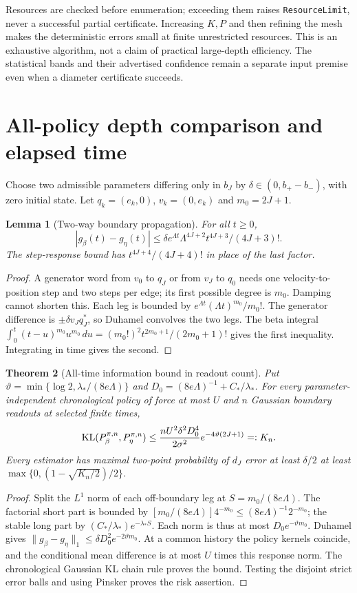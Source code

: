 \documentclass[11pt,reqno]{amsart}
\newtheorem{theorem}{Theorem}[section]
\newtheorem{lemma}[theorem]{Lemma}
\theoremstyle{remark}\newtheorem{remark}[theorem]{Remark}
\begin{document}
Resources are checked before enumeration; exceeding them raises
\texttt{ResourceLimit}, never a successful partial certificate. Increasing
$K,P$ and then refining the mesh makes the deterministic errors small at finite
unrestricted resources. This is an exhaustive algorithm, not a claim of practical
large-depth efficiency. The statistical bands and their advertised confidence
remain a separate input premise even when a diameter certificate succeeds.

\section{All-policy depth comparison and elapsed time}
\label{sec:optimality}
Choose two admissible parameters differing only in $b_J$ by
$\delta\in(0,b_+-b_-)$, with zero initial state. Let
$q_k=(e_k,0)$, $v_k=(0,e_k)$ and $m_0=2J+1$.

\begin{lemma}[Two-way boundary propagation]
\label{lem:two-way}
For all $t\ge0$,
\[
 |g_\beta(t)-g_\eta(t)|\le
 \delta e^{\Lambda t}\Lambda^{4J+2}t^{4J+3}/(4J+3)!.
\]
The step-response bound has $t^{4J+4}/(4J+4)!$ in place of the last factor.
\end{lemma}
\begin{proof}
A generator word from $v_0$ to $q_J$ or from $v_J$ to $q_0$ needs one
velocity-to-position step and two steps per edge; its first possible degree
is $m_0$. Damping cannot shorten this. Each leg is bounded by
$e^{\Lambda t}(\Lambda t)^{m_0}/m_0!$.
The generator difference is $\pm\delta v_Jq_J^*$, so Duhamel convolves the
two legs. The beta integral
$\int_0^t(t-u)^{m_0}u^{m_0}\,du=(m_0!)^2t^{2m_0+1}/(2m_0+1)!$
gives the first inequality. Integrating in time gives the second.
\end{proof}

\begin{theorem}[All-time information bound in readout count]
\label{thm:global}
Put $\vartheta=\min\{\log2,\lambda_* /(8e\Lambda)\}$ and
$D_0=(8e\Lambda)^{-1}+C_*/\lambda_*$. For every parameter-independent
chronological policy of force at most $U$ and $n$ Gaussian boundary readouts
at selected finite times,
\[
 \operatorname{KL}(P_\beta^{\pi,n},P_\eta^{\pi,n})
 \le\frac{nU^2\delta^2D_0^4}{2\sigma^2}e^{-4\vartheta(2J+1)}=:K_n.
\]
Every estimator has maximal two-point probability of $d_J$ error at least
$\delta/2$ at least $\max\{0,(1-\sqrt{K_n/2})/2\}$.
\end{theorem}
\begin{proof}
Split the $L^1$ norm of each off-boundary leg at $S=m_0/(8e\Lambda)$.
The factorial short part is bounded by
$[m_0/(8e\Lambda)]4^{-m_0}\le(8e\Lambda)^{-1}2^{-m_0}$;
the stable long part by $(C_*/\lambda_*)e^{-\lambda_*S}$.
Each norm is thus at most $D_0e^{-\vartheta m_0}$.
Duhamel gives $\|g_\beta-g_\eta\|_1\le\delta D_0^2e^{-2\vartheta m_0}$.
At a common history the policy kernels coincide, and the conditional mean
difference is at most $U$ times this response norm. The chronological Gaussian
KL chain rule proves the bound. Testing the disjoint strict error balls and
using Pinsker proves the risk assertion.
\end{proof}
\end{document}
